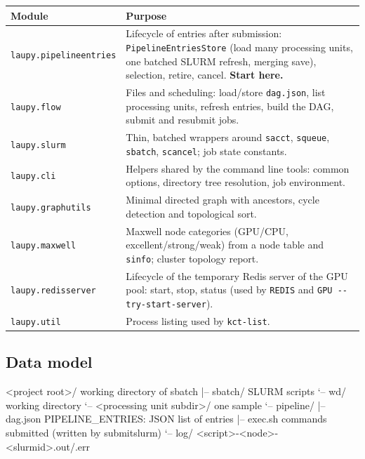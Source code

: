 \documentclass[11pt,a4paper]{article}
\DeclareRobustCommand{\_}{\textunderscore\allowbreak}
\newcommand{\cmd}[1]{\texttt{#1}}
\begin{document}
\begin{center}
\begin{tabularx}{\linewidth}{@{}l>{\raggedright\arraybackslash}X@{}}
\toprule
Module & Purpose \\
\midrule
\cmd{laupy.pipeline\_entries} & Lifecycle of entries after submission: \cmd{PipelineEntriesStore} (load many processing units, one batched SLURM refresh, merging save), selection, retire, cancel. \textbf{Start here.} \\
\cmd{laupy.flow} & Files and scheduling: load/store \cmd{dag.json}, list processing units, refresh entries, build the DAG, submit and resubmit jobs. \\
\cmd{laupy.slurm} & Thin, batched wrappers around \cmd{sacct}, \cmd{squeue}, \cmd{sbatch}, \cmd{scancel}; job state constants. \\
\cmd{laupy.cli} & Helpers shared by the command line tools: common options, directory tree resolution, job environment. \\
\cmd{laupy.graph\_utils} & Minimal directed graph with ancestors, cycle detection and topological sort. \\
\cmd{laupy.maxwell} & Maxwell node categories (GPU/CPU, excellent/strong/weak) from a node table and \cmd{sinfo}; cluster topology report. \\
\cmd{laupy.redis\_server} & Lifecycle of the temporary Redis server of the GPU pool: start, stop, status (used by \cmd{REDIS} and \cmd{GPU -{}-try-start-server}). \\
\cmd{laupy.util} & Process listing used by \cmd{kct-list}. \\
\bottomrule
\end{tabularx}
\end{center}

\subsection{Data model}

\begin{terminal}
<project root>/                       working directory of sbatch
|-- sbatch/                           SLURM scripts
`-- wd/                               working directory
    `-- <processing unit subdir>/     one sample
        `-- pipeline/
            |-- dag.json              PIPELINE_ENTRIES: JSON list of entries
            |-- exec.sh               commands submitted (written by submitslurm)
            `-- log/                  <script>-<node>-<slurmid>.out/.err
\end{terminal}
\end{document}
